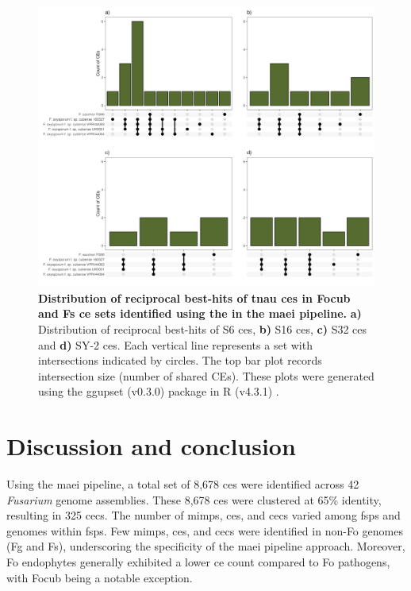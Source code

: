  
\begin{figure}[hp!]
    \centering
    \includegraphics[width=\textwidth]{Figures/UpSetPlots.png}
    \caption[Distribution of reciprocal best-hits of \ac{tnau} \acp{ce}  in \ac{Focub} and \ac{Fs} \ac{ce} sets identified using the in the \ac{maei} pipeline.]{\textbf{Distribution of reciprocal best-hits of \ac{tnau} \acp{ce} in \ac{Focub} and \ac{Fs} \ac{ce} sets identified using the in the \ac{maei} pipeline.} \textbf{a)} Distribution of reciprocal best-hits of S6 \acp{ce}, \textbf{b)} S16 \acp{ce}, \textbf{c)} S32 \acp{ce} and \textbf{d)} SY-2 \acp{ce}. Each vertical line represents a set with intersections indicated by circles. The top bar plot records intersection size (number of shared CEs). These plots were generated using the ggupset (v0.3.0) \parencite{ggupset} package in R (v4.3.1) \parencite{R}.}
    \label{fig:RBHupsets}
\end{figure}

\clearpage
\section{Discussion and conclusion}

Using the \ac{maei} pipeline, a total set of 8,678 \acp{ce} were identified across 42 \textit{Fusarium} genome assemblies. These 8,678 \acp{ce} were clustered at 65\% identity, resulting in 325 \acfp{cec}. The number of \acp{mimp}, \acp{ce}, and \acp{cec} varied among \acp{fsp} and genomes within \acp{fsp}. Few \acp{mimp}, \acp{ce}, and \acp{cec} were identified in non-\ac{Fo} genomes (\acl{Fg} and \acl{Fs}), underscoring the specificity of the \ac{maei} pipeline approach. Moreover, \ac{Fo} endophytes generally exhibited a lower \ac{ce} count compared to \ac{Fo} pathogens, with \ac{Focub} being a notable exception. 

